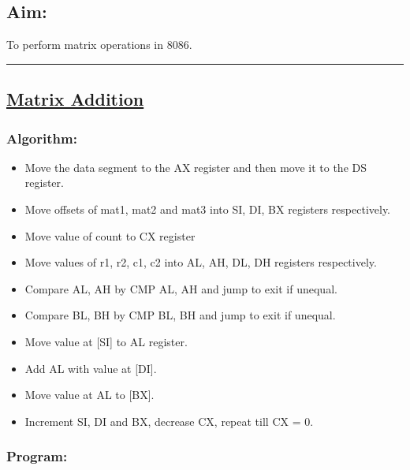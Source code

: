 \documentclass[12pt,a4paper]{article}
\begin{document}
\begin{flushleft}
\subsection*{\textbf{Aim:}} 
To perform matrix operations in 8086.

\vspace{1cm}
\hrule
\subsection*{\textbf{\underline{Matrix Addition}}}

\subsubsection*{\textbf{Algorithm:}}
\begin{itemize}
    \item Move the data segment to the AX register and then move it to the DS register.
    \item Move offsets of mat1, mat2 and mat3 into SI, DI, BX registers respectively.
    \item Move value of count to CX register
    \item Move values of r1, r2, c1, c2 into AL, AH, DL, DH registers respectively. 
    \item Compare AL, AH by CMP AL, AH and jump to exit if unequal.
    \item Compare BL, BH by CMP BL, BH and jump to exit if unequal.
    \item Move value at [SI] to AL register.
    \item Add AL with value at [DI].
    \item Move value at AL to [BX].
    \item Increment SI, DI and BX, decrease CX, repeat till CX = 0.
\end{itemize}

\newpage
\subsubsection*{\textbf{Program:}}


\end{flushleft}
\end{document}
